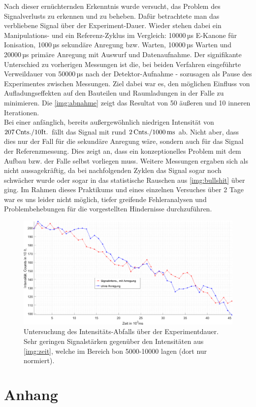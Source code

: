 \documentclass[numbers=noenddot,a4paper,notitlepage,twoside,BCOR15mm]{scrartcl}
\begin{document}
		Nach dieser ernüchternden Erkenntnis wurde versucht, das Problem des Signalverlusts zu erkennen und zu beheben. Dafür betrachtete man das verbliebene Signal über der Experiment-Dauer. Wieder stehen dabei ein Manipulations- und ein Referenz-Zyklus im Vergleich: 10000\,µs E-Kanone für Ionisation, 1000\,µs sekundäre Anregung bzw. Warten, 10000\,µs Warten und 20000\,µs primäre Anregung mit Auswurf und Datenaufnahme. Der signifikante Unterschied zu vorherigen Messungen ist die, bei beiden Verfahren eingeführte Verweildauer von 50000\,µs nach der Detektor-Aufnahme - sozusagen als Pause des Experimentes zwischen Messungen. Ziel dabei war es, den möglichen Einfluss von Aufladungseffekten auf den Bauteilen und Raumladungen in der Falle zu minimieren. Die \autoref{img:abnahme} zeigt das Resultat von 50 äußeren und 10 inneren Iterationen.\\
		Bei einer anfänglich, bereits außergewöhnlich niedrigen Intensität von $\unit[207]{Cnts./10 It.}$ fällt das Signal mit rund $\unit[2]{Cnts./1000\,ms}$ ab. Nicht aber, dass dies nur der Fall für die sekundäre Anregung wäre, sondern auch für das Signal der Referenzmessung. Dies zeigt an, dass ein konzeptionelles Problem mit dem Aufbau bzw. der Falle selbst vorliegen muss. Weitere Messungen ergaben sich als nicht aussagekräftig, da bei nachfolgenden Zyklen das Signal sogar noch schwächer wurde oder sogar in das statistische Rauschen aus \autoref{img:bullshit} über ging. Im Rahmen dieses Praktikums und eines einzelnen Versuches über 2 Tage war es uns leider nicht möglich, tiefer greifende Fehleranalysen und Problembehebungen für die vorgestellten Hindernisse durchzuführen.
		
		\begin{figure}
			\includegraphics[width=\textwidth]{pics/signal_abfall.png}
			\caption{Untersuchung des Intensitäts-Abfalls über der Experimentdauer. Sehr geringen Signalstärken gegenüber den Intensitäten aus \autoref{img:zeit}, welche im Bereich bon 5000-10000 lagen (dort nur normiert).}\label{img:abnahme}
		\end{figure}
		
		\clearpage
		\section{Anhang}
		
		
		
		
	
\end{document}
